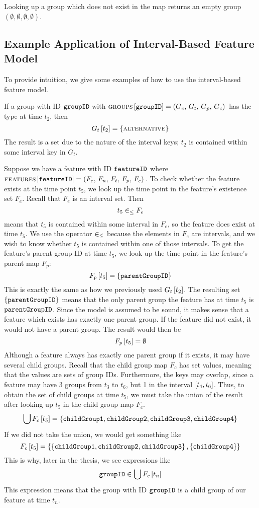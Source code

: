 Looking up a group which does not exist in the map returns an empty group $(\emptyset \comma \emptyset \comma \emptyset \comma \emptyset)$. 

\subsection{Example \textemdash{} Application of Interval-Based Feature Model}
\label{sec:how-to-use-the-interval-based-feature-model}
To provide intuition, we give some examples of how to use the interval-based feature model.

If a group with ID $\texttt{groupID}$ with $\textsc{groups}{} \left[ \texttt{groupID} \right] = \left(G_e,\, G_t,\, G_p,\, G_c\right){}$ has the type \xortype{} at time $t_2$, then
\[
  G_t \left[ t_2 \right] = \left\{\textsc{alternative}{}\right\}
\]
The result is a set due to the nature of the interval keys; $t_2$ is contained within some interval key in $G_t$. 

Suppose we have a feature with ID $\texttt{featureID}$ where $\textsc{features} \left[ \texttt{featureID} \right] = \left(F_e,\, F_n,\, F_t,\, F_p,\, F_c\right){}$. To check whether the feature exists at the time point $t_5$, we look up the time point in the feature's existence set $F_e$. Recall that $F_e$ is an interval set. Then
\[
  t_5 \in_\leq F_e
\]
means that $t_5$ is contained within some interval in $F_e$, so the feature does exist at time $t_5$. We use the operator $\in_\leq$ because the elements in $F_e$ are intervals, and we wish to know whether $t_5$ is contained within one of those intervals. To get the feature's parent group ID at time $t_5$, we look up the time point in the feature's parent map $F_p$:
\[
  F_p \left[ t_5 \right] = \left\{\texttt{parentGroupID}\right\}
\]
This is exactly the same as how we previously used $G_t \left[ t_2 \right]$. The resulting set $\left\{\texttt{parentGroupID}\right\}$ means that the only parent group the feature has at time $t_5$ is $\texttt{parentGroupID}$. Since the model is assumed to be sound, it makes sense that a feature which exists has exactly one parent group. If the feature did not exist, it would not have a parent group. The result would then be
\[
  F_p \left[ t_5 \right] = \emptyset
\]
Although a feature always has exactly one parent group if it exists, it may have several child groups. Recall that the child group map $F_c$ has set values, meaning that the values are sets of group IDs. Furthermore, the keys may overlap, since a feature may have 3 groups from $t_3$ to $t_6$, but 1 in the interval $\interval{t_4}{t_6}$. Thus, to obtain the set of child groups at time $t_5$, we must take the union of the result after looking up $t_5$ in the child group map $F_c$.
\[
  \bigcup{F_c \left[ t_5 \right]} = \left\{\texttt{childGroup1}, \texttt{childGroup2}, \texttt{childGroup3}, \texttt{childGroup4}\right\}
\]
If we did not take the union, we would get something like
\[
  F_c \left[ t_5 \right] = \left\{\left\{\texttt{childGroup1}, \texttt{childGroup2}, \texttt{childGroup3}\right\},  \left\{\texttt{childGroup4}\right\}\right\}
\]
This is why, later in the thesis, we see expressions like
\[
  \texttt{groupID} \in \bigcup{F_c \left[ t_n \right]}
\]
This expression means that the group with ID $\texttt{groupID}$ is a child group of our feature at time $t_n$.

